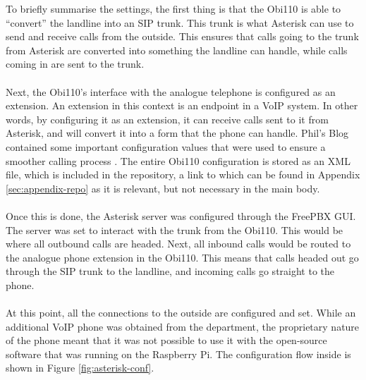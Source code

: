 \documentclass[main.tex]{subfiles}
\begin{document}
To briefly summarise the settings, the first thing is that the Obi110 is able to ``convert'' the landline into an SIP trunk. This trunk is what Asterisk can use to send and receive calls from the outside. This ensures that calls going to the trunk from Asterisk are converted into something the landline can handle, while calls coming in are sent to the trunk.
\\\\
Next, the Obi110's interface with the analogue telephone is configured as an extension. An extension in this context is an endpoint in a VoIP system. In other words, by configuring it as an extension, it can receive calls sent to it from Asterisk, and will convert it into a form that the phone can handle. Phil's Blog contained some important configuration values that were used to ensure a smoother calling process \cite{obihaiuk}. The entire Obi110 configuration is stored as an XML file, which is included in the repository, a link to which can be found in Appendix \ref{sec:appendix-repo} as it is relevant, but not necessary in the main body.
\\\\
Once this is done, the Asterisk server was configured through the FreePBX GUI. The server was set to interact with the trunk from the Obi110. This would be where all outbound calls are headed. Next, all inbound calls would be routed to the analogue phone extension in the Obi110. This means that calls headed out go through the SIP trunk to the landline, and incoming calls go straight to the phone.
\\\\
At this point, all the connections to the outside are configured and set. While an additional VoIP phone was obtained from the department, the proprietary nature of the phone meant that it was not possible to use it with the open-source software that was running on the Raspberry Pi. The configuration flow inside is shown in Figure \ref{fig:asterisk-conf}.
\end{document}
